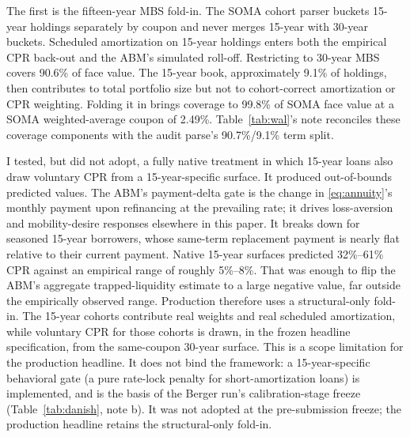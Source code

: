 \documentclass[12pt]{article}
\begin{document}
The first is the fifteen-year MBS fold-in. The SOMA cohort parser buckets 15-year holdings separately by coupon and never merges 15-year with 30-year buckets. Scheduled amortization on 15-year holdings enters both the empirical CPR back-out and the ABM's simulated roll-off. Restricting to 30-year MBS covers 90.6\% of face value. The 15-year book, approximately 9.1\% of holdings, then contributes to total portfolio size but not to cohort-correct amortization or CPR weighting. Folding it in brings coverage to 99.8\% of SOMA face value at a SOMA weighted-average coupon of 2.49\%. Table~\ref{tab:wal}'s note reconciles these coverage components with the audit parse's 90.7\%/9.1\% term split.

I tested, but did not adopt, a fully native treatment in which 15-year loans also draw voluntary CPR from a 15-year-specific surface. It produced out-of-bounds predicted values. The ABM's payment-delta gate is the change in \eqref{eq:annuity}'s monthly payment upon refinancing at the prevailing rate; it drives loss-aversion and mobility-desire responses elsewhere in this paper. It breaks down for seasoned 15-year borrowers, whose same-term replacement payment is nearly flat relative to their current payment. Native 15-year surfaces predicted 32\%--61\% CPR against an empirical range of roughly 5\%--8\%. That was enough to flip the ABM's aggregate trapped-liquidity estimate to a large negative value, far outside the empirically observed range. Production therefore uses a structural-only fold-in. The 15-year cohorts contribute real weights and real scheduled amortization, while voluntary CPR for those cohorts is drawn, in the frozen headline specification, from the same-coupon 30-year surface. This is a scope limitation for the production headline. It does not bind the framework: a 15-year-specific behavioral gate (a pure rate-lock penalty for short-amortization loans) is implemented, and is the basis of the Berger run's calibration-stage freeze (Table~\ref{tab:danish}, note b). It was not adopted at the pre-submission freeze; the production headline retains the structural-only fold-in.
\end{document}
